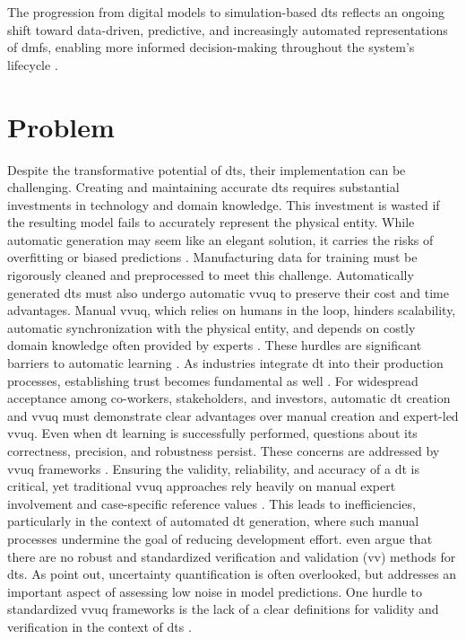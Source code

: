 The progression from digital models to simulation-based \gls{dt}s reflects an ongoing shift toward data-driven, predictive, and increasingly automated representations of \gls{dmfs}, enabling more informed decision-making throughout the system's lifecycle \autocite{boschert2016digital,lim2020state}.

\section{Problem}
\label{sec:problem}
Despite the transformative potential of \gls{dt}s, their implementation can be challenging. Creating and maintaining accurate \gls{dt}s requires substantial investments in technology and domain knowledge. This investment is wasted if the resulting model fails to accurately represent the physical entity. While automatic generation may seem like an elegant solution, it carries the risks of overfitting or biased predictions \autocite{gemanbias}. Manufacturing data for training must be rigorously cleaned and preprocessed to meet this challenge. Automatically generated \gls{dt}s must also undergo automatic \gls{vvuq} to preserve their cost and time advantages. Manual \gls{vvuq}, which relies on humans in the loop, hinders scalability, automatic synchronization with the physical entity, and depends on costly domain knowledge often provided by experts \autocite{Bitencourt2023}. These hurdles are significant barriers to automatic learning \autocite{ribeiro2016should,zhao2024data}. As industries integrate \gls{dt} into their production processes, establishing trust becomes fundamental as well \autocite{trauer2022digital,arrieta2020explainable}. For widespread acceptance among co-workers, stakeholders, and investors, automatic \gls{dt} creation and \gls{vvuq} must demonstrate clear advantages over manual creation and expert-led \gls{vvuq}. Even when \gls{dt} learning is successfully performed, questions about its correctness, precision, and robustness persist. These concerns are addressed by \gls{vvuq} frameworks \autocite{sel2025survey}. Ensuring the validity, reliability, and accuracy of a \gls{dt} is critical, yet traditional \gls{vvuq} approaches rely heavily on manual expert involvement and case-specific reference values \autocite{Bitencourt2023,hua2022validation}. This leads to inefficiencies, particularly in the context of automated \gls{dt} generation, where such manual processes undermine the goal of reducing development effort. \textcite{hua2022validation} even argue that there are no robust and standardized verification and validation (\gls{vv}) methods for \gls{dt}s. As \textcite{sel2025survey} point out, uncertainty quantification is often overlooked, but addresses an important aspect of assessing low noise in model predictions. One hurdle to standardized \gls{vvuq} frameworks is the lack of a clear definitions for validity and verification in the context of \gls{dt}s \autocite{Bitencourt2023}.

